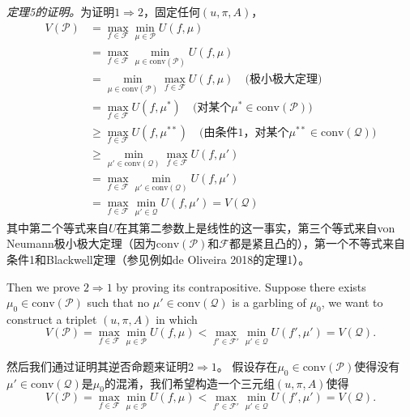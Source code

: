 \documentclass[12pt,a4paper]{article}
\newenvironment{original}
  {\par\vspace{4pt}\noindent\color{black}\ignorespaces}
  {\par\vspace{2pt}}
\newenvironment{translation}
  {\par\vspace{2pt}\noindent\color{myblue}\ignorespaces}
  {\par\vspace{6pt}}
\newcommand{\calF}{\mathcal{F}}
\newcommand{\conv}{\mathrm{conv}}
\begin{document}
\begin{translation}
\textit{定理5的证明。}为证明$1\Rightarrow 2$，固定任何$(u,\pi,A)$，
\begin{align}
    V(\mathcal{P}) &= \max_{f\in\calF} \min_{\mu\in\mathcal{P}} U(f, \mu) \nonumber\\
                   &= \max_{f\in\calF} \min_{\mu\in\conv(\mathcal{P})} U(f, \mu) \nonumber\\
                   &= \min_{\mu\in\conv(\mathcal{P})} \max_{f\in\calF} U(f, \mu) \quad\text{(极小极大定理)}\nonumber\\
                   &= \max_{f\in\calF} U(f, \mu^*) \quad\text{(对某个}\mu^*\in\conv(\mathcal{P})\text{)} \nonumber\\
                   &\geq \max_{f\in\calF} U(f, \mu^{**}) \quad\text{(由条件1，对某个}\mu^{**}\in\conv(\mathcal{Q})\text{)}\nonumber\\
                   &\geq \min_{\mu'\in\conv(\mathcal{Q})} \max_{f\in\calF} U(f, \mu') \nonumber\\
                   &= \max_{f\in\calF} \min_{\mu'\in\conv(\mathcal{Q})} U(f, \mu') \nonumber\\
                   &= \max_{f\in\calF} \min_{\mu'\in\mathcal{Q}} U(f, \mu') = V(\mathcal{Q})
\end{align}
其中第二个等式来自$U$在其第二参数上是线性的这一事实，第三个等式来自von Neumann极小极大定理（因为$\conv(\mathcal{P})$和$\calF$都是紧且凸的），第一个不等式来自条件1和Blackwell定理（参见例如de Oliveira 2018的定理1）。
\end{translation}

\begin{original}
Then we prove $2\Rightarrow 1$ by proving its contrapositive.
Suppose there exists $\mu_0\in\conv(\mathcal{P})$ such that no $\mu'\in\conv(\mathcal{Q})$ is a garbling of $\mu_0$, we want to construct a triplet $(u,\pi,A)$ in which
\begin{equation}
    V(\mathcal{P}) = \max_{f\in\calF} \min_{\mu\in\mathcal{P}} U(f,\mu) < \max_{f'\in\calF'} \min_{\mu'\in\mathcal{Q}} U(f',\mu') = V(\mathcal{Q}).
\end{equation}
\end{original}

\begin{translation}
然后我们通过证明其逆否命题来证明$2\Rightarrow 1$。
假设存在$\mu_0\in\conv(\mathcal{P})$使得没有$\mu'\in\conv(\mathcal{Q})$是$\mu_0$的混淆，我们希望构造一个三元组$(u,\pi,A)$使得
\begin{equation}
    V(\mathcal{P}) = \max_{f\in\calF} \min_{\mu\in\mathcal{P}} U(f,\mu) < \max_{f'\in\calF'} \min_{\mu'\in\mathcal{Q}} U(f',\mu') = V(\mathcal{Q}).
\end{equation}
\end{translation}
\end{document}

